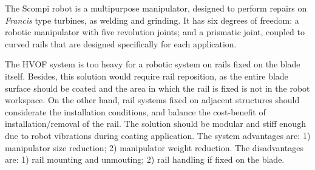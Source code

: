 The Scompi robot \citep{scompi} %
is a multipurpose manipulator, designed to perform repairs on \textit{Francis}
type turbines, as welding and grinding. It has six degrees of freedom: a robotic
manipulator with five revolution joints; and a prismatic joint, coupled to
curved rails that are designed specifically for each application.



The HVOF system is too heavy for a robotic system on rails fixed
on the blade itself. Besides, this solution would require rail reposition, as
the entire blade surface should be coated and the area in which the rail is
fixed is not in the robot workspace. On the other hand, rail systems fixed on
adjacent structures should considerate the installation conditions, and balance
the cost-benefit of installation/removal of the rail. The solution should be
modular and stiff enough due to robot vibrations during coating application.
The system advantages are: 1) manipulator size reduction; 2) manipulator
weight reduction. The disadvantages are: 1) rail mounting and unmouting; 2) rail
handling if fixed on the blade.
